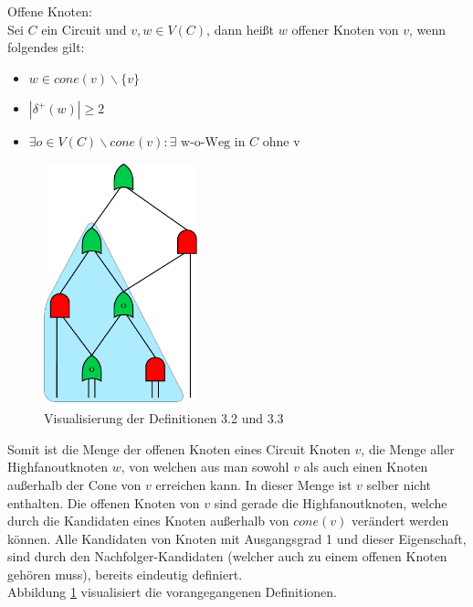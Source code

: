 \documentclass[11pt, a4paper, german]{article}
\begin{document}
\begin{definition}{Offene Knoten:}\\
	Sei $C$ ein Circuit und $v,w \in V(C)$, dann heißt $w$ offener Knoten von $v$, wenn folgendes gilt: 
	\begin{itemize}
		\item $ w \in cone(v)\backslash \{ v \} $
		\item $| \delta ^{+}(w)| \geq 2$
		\item $ \exists o \in V(C) \backslash cone(v) : \exists \text{ w-o-Weg in } C \text{ ohne v} $
	\end{itemize}	
\end{definition}
 \begin{figure}
		\includegraphics[height = 7cm]{pictures/compiled/cone}
		\caption{Visualisierung der Definitionen 3.2 und 3.3}
		\label{bild:cone}
\end{figure}
Somit ist die Menge der offenen Knoten eines Circuit Knoten $v$, die Menge aller Highfanoutknoten $w$, von welchen aus man sowohl $v$ als auch einen Knoten außerhalb der Cone von $v$ erreichen kann. In dieser Menge ist $v$ selber nicht enthalten. Die offenen Knoten von $v$ sind gerade die Highfanoutknoten, welche durch die Kandidaten eines Knoten außerhalb von $cone(v)$ verändert werden können. Alle Kandidaten von  Knoten mit Ausgangsgrad 1 und dieser Eigenschaft, sind durch den Nachfolger-Kandidaten (welcher auch zu einem offenen Knoten gehören muss), bereits eindeutig definiert. \\
Abbildung \ref{bild:cone} visualisiert die vorangegangenen Definitionen.\\
\end{document}
